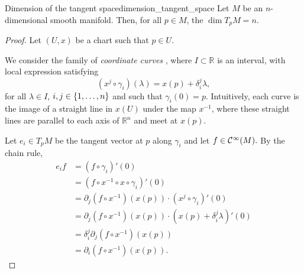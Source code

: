 \begin{theorem}{Dimension of the tangent space}{dimension_tangent_space}
    Let \(M\) be an \(n\)-dimensional smooth manifold. Then, for all \(p \in M\), the \(\dim T_pM = n\).
\end{theorem}
\begin{proof}
    Let \((U, x)\) be a chart such that \(p \in U\).%

    We consider the family of \emph{coordinate curves} , where \(I \subset \mathbb{R}\) is an interval, with local expression satisfying
    \begin{equation*}
        (x^j \circ \gamma_i)(\lambda) = x(p) + \delta_i^j \lambda,
    \end{equation*}
    for all \(\lambda \in I\), \(i, j \in \{1, \dots, n\}\) and such that \(\gamma_i(0) = p\).
    Intuitively, each curve is the image of a straight line in \(x(U)\) under the map \(x^{-1}\), where these straight lines are parallel to each axis of \(\mathbb{R}^n\) and meet at \(x(p)\).

    Let \(e_i \in T_pM\) be the tangent vector at \(p\) along \(\gamma_i\) and let \(f \in \mathcal{C}^\infty(M).\) By the chain rule,
    \begin{align*}
        e_i f &= (f\circ \gamma_i)'(0)\\
              &= (f \circ x^{-1} \circ x \circ \gamma_i)'(0)\\
              &= \partial_j (f \circ x^{-1})(x(p)) \cdot (x^j \circ \gamma_i)'(0)\\
              &= \partial_j (f \circ x^{-1})(x(p)) \cdot (x(p) + \delta_i^j \lambda)'(0)\\
              &= \delta_i^j \partial_j (f \circ x^{-1})(x(p))\\
              &= \partial_i (f \circ x^{-1})(x(p)).
    \end{align*}


\end{proof}
